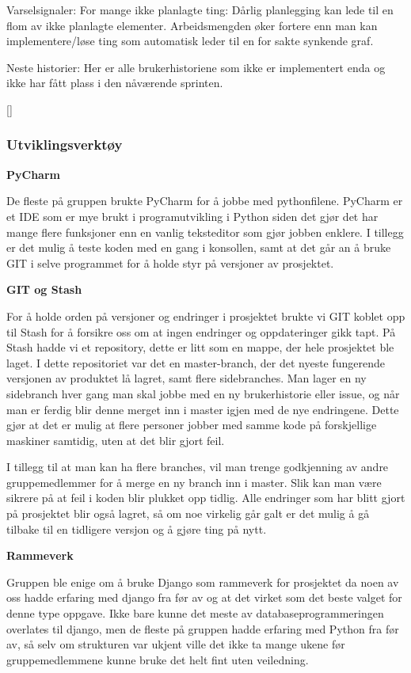 \documentclass[12pt,a4paper,norsk]{article}
\begin{document}
    Varselsignaler:
	For mange ikke planlagte ting:
    Dårlig planlegging kan lede til en flom av ikke planlagte elementer. Arbeidsmengden øker fortere enn man kan implementere/løse ting som automatisk leder til en for sakte synkende graf.

    Neste historier:
    Her er alle brukerhistoriene som ikke er implementert enda og ikke har fått plass i den nåværende sprinten.
    
    [\cite{kniberg}]


	\subsubsection{Utviklingsverktøy}

\textbf{PyCharm}
\par De fleste på gruppen brukte PyCharm for å jobbe med pythonfilene. PyCharm er et IDE som er mye brukt i programutvikling i Python siden det gjør det har mange flere funksjoner enn en vanlig teksteditor som gjør jobben enklere. I tillegg er det mulig å teste koden med en gang i konsollen, samt at det går an å bruke GIT i selve programmet for å holde styr på versjoner av prosjektet.

\bigskip \noindent \textbf{GIT og Stash}
\par For å holde orden på versjoner og endringer i prosjektet brukte vi GIT koblet opp til Stash for å forsikre oss om at ingen endringer og oppdateringer gikk tapt. På Stash hadde vi et repository, dette er litt som en mappe, der hele prosjektet ble laget. I dette repositoriet var det en master-branch, der det nyeste fungerende versjonen av produktet lå lagret, samt flere sidebranches. Man lager en ny sidebranch hver gang man skal jobbe med en ny brukerhistorie eller issue, og når man er ferdig blir denne merget inn i master igjen med de nye endringene. Dette gjør at det er mulig at flere personer jobber med samme kode på forskjellige maskiner samtidig, uten at det blir gjort feil.

I tillegg til at man kan ha flere branches, vil man trenge godkjenning av andre gruppemedlemmer for å merge en ny branch inn i master. Slik kan man være sikrere på at feil i koden blir plukket opp tidlig. Alle endringer som har blitt gjort på prosjektet blir også lagret, så om noe virkelig går galt er det mulig å gå tilbake til en tidligere versjon og å gjøre ting på nytt.

\bigskip \noindent \textbf{Rammeverk}
\par Gruppen ble enige om å bruke Django som rammeverk for prosjektet da noen av oss hadde erfaring med django fra før av og at det virket som det beste valget for denne type oppgave. Ikke bare kunne det meste av databaseprogrammeringen overlates til django, men de fleste på gruppen hadde erfaring med Python fra før av, så selv om strukturen var ukjent ville det ikke ta mange ukene før gruppemedlemmene kunne bruke det helt fint uten veiledning.
\end{document}
